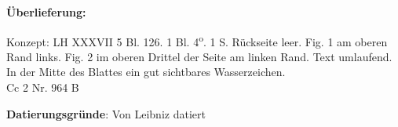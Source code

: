       
               
                \begin{ledgroupsized}[r]{120mm}
                \footnotesize 
                \pstart                
                \noindent\textbf{\"{U}berlieferung:}   
                \pend
                \end{ledgroupsized}
            
              
                            \begin{ledgroupsized}[r]{114mm}
                            \footnotesize 
                            \pstart \parindent -6mm
                            Konzept: LH XXXVII 5 Bl. 126. 1 Bl. 4\textsuperscript{o}. 1 S. R\"{u}ckseite leer.  Fig. 1 am oberen Rand links. Fig. 2 im oberen Drittel der Seite am linken Rand. Text umlaufend. In der Mitte des Blattes ein gut sichtbares Wasserzeichen.\\Cc 2 Nr. 964 B \pend
                            \end{ledgroupsized}
                \vspace*{5mm}
                \begin{ledgroup}
                \footnotesize 
                \pstart
            \noindent\footnotesize{\textbf{Datierungsgr\"{u}nde}: Von Leibniz datiert}
                \pend
                \end{ledgroup}
            

